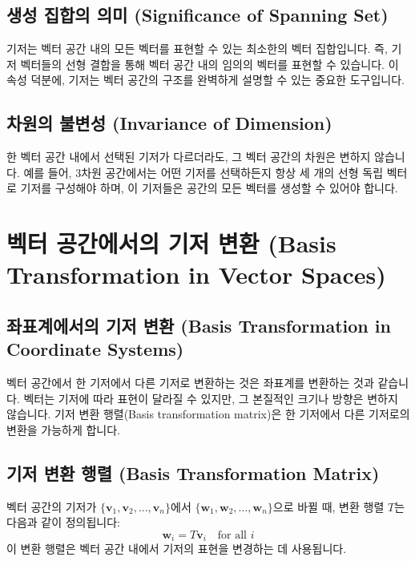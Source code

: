 \documentclass[12pt]{article}
\begin{document}
\subsection{생성 집합의 의미 (Significance of Spanning Set)}

\noindent 기저는 벡터 공간 내의 모든 벡터를 표현할 수 있는 최소한의 벡터 집합입니다. 즉, 기저 벡터들의 선형 결합을 통해 벡터 공간 내의 임의의 벡터를 표현할 수 있습니다. 이 속성 덕분에, 기저는 벡터 공간의 구조를 완벽하게 설명할 수 있는 중요한 도구입니다.

\subsection{차원의 불변성 (Invariance of Dimension)}

\noindent 한 벡터 공간 내에서 선택된 기저가 다르더라도, 그 벡터 공간의 차원은 변하지 않습니다. 예를 들어, 3차원 공간에서는 어떤 기저를 선택하든지 항상 세 개의 선형 독립 벡터로 기저를 구성해야 하며, 이 기저들은 공간의 모든 벡터를 생성할 수 있어야 합니다.

\section{벡터 공간에서의 기저 변환 (Basis Transformation in Vector Spaces)}

\subsection{좌표계에서의 기저 변환 (Basis Transformation in Coordinate Systems)}

\noindent 벡터 공간에서 한 기저에서 다른 기저로 변환하는 것은 좌표계를 변환하는 것과 같습니다. 벡터는 기저에 따라 표현이 달라질 수 있지만, 그 본질적인 크기나 방향은 변하지 않습니다. 기저 변환 행렬(Basis transformation matrix)은 한 기저에서 다른 기저로의 변환을 가능하게 합니다.

\subsection{기저 변환 행렬 (Basis Transformation Matrix)}

\noindent 벡터 공간의 기저가 \( \{ \mathbf{v}_1, \mathbf{v}_2, \dots, \mathbf{v}_n \} \)에서 \( \{ \mathbf{w}_1, \mathbf{w}_2, \dots, \mathbf{w}_n \} \)으로 바뀔 때, 변환 행렬 \( T \)는 다음과 같이 정의됩니다:
\[
  \mathbf{w}_i = T \mathbf{v}_i \quad \text{for all } i
\]
이 변환 행렬은 벡터 공간 내에서 기저의 표현을 변경하는 데 사용됩니다.
\end{document}
